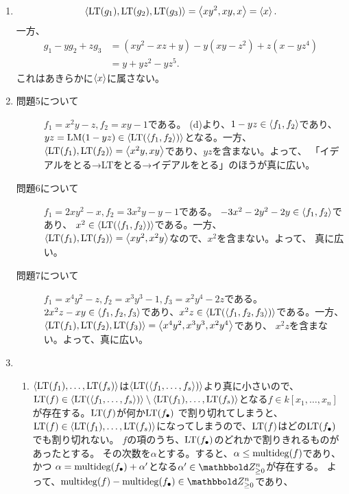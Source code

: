 \documentclass[9pt]{ltjsarticle}
\begin{document}
\begin{enumerate}[label=(問題\arabic*)]
  \item
\begin{align}
  \left\langle {\rm LT}(g_1),{\rm LT}(g_2),{\rm LT}(g_3) \right\rangle = \left\langle xy^2,xy,x \right\rangle = \left\langle x \right\rangle.
\end{align}
一方、
\begin{align}
  g_1 - yg_2 +zg_3
  &=
  (xy^2-xz+y) - y(xy-z^2) +z(x-yz^4)\\
  &=
  y+yz^2 -yz^5.
\end{align}
これはあきらかに$\left\langle x \right\rangle$に属さない。
  \item
  \begin{description}
    \item[問題5について] $f_1=x^2y-z,f_2=xy-1$である。
    (d)より、$1-yz \in \left\langle f_1,f_2 \right\rangle$であり、
    $yz = {\rm LM}(1-yz) \in \left\langle {\rm LT}(\left\langle f_1,f_2 \right\rangle) \right\rangle$となる。一方、
    $\left\langle {\rm LT}(f_1),{\rm LT}(f_2) \right\rangle = \left\langle x^2y,xy \right\rangle$であり、$yz$を含まない。よって、
    「イデアルをとる→LTをとる→イデアルをとる」のほうが真に広い。
    \item[問題6について] $f_1=2xy^2-x,f_2=3x^2y-y-1$である。
    $-3x^2-2y^2-2y \in \left\langle f_1,f_2 \right\rangle$であり、
    $x^2 \in \left\langle {\rm LT}(\left\langle f_1,f_2 \right\rangle) \right\rangle$である。一方、
    $\left\langle {\rm LT}(f_1),{\rm LT}(f_2) \right\rangle = \left\langle xy^2,x^2y \right\rangle$なので、$x^2$を含まない。よって、
    真に広い。
    \item[問題7について] $f_1=x^4y^2-z,f_2=x^3y^3-1,f_3=x^2y^4-2z$である。
    $2x^2z-xy \in \left\langle f_1,f_2,f_3 \right\rangle$であり、$x^2z \in \left\langle {\rm LT}(\left\langle f_1,f_2,f_3 \right\rangle) \right\rangle$である。一方、
    $\left\langle {\rm LT}(f_1),{\rm LT}(f_2),{\rm LT}(f_3) \right\rangle = \left\langle x^4y^2,x^3y^3,x^2y^4 \right\rangle$であり、
    $x^2z$を含まない。よって、真に広い。
  \end{description}
  \item
  \begin{enumerate}[label=(\alph*)]
    \item
  $\left\langle {\rm LT}(f_1),\dots,{\rm LT}(f_s) \right\rangle$は$\left\langle {\rm LT}(\left\langle f_1,\dots,f_s \right\rangle) \right\rangle$より真に小さいので、${\rm LT}(f)\in \left\langle {\rm LT}(\left\langle f_1,\dots,f_s \right\rangle) \right\rangle\setminus\left\langle {\rm LT}(f_1),\dots,{\rm LT}(f_s) \right\rangle$となる$f \in k[x_1,\dots,x_n]$が存在する。${\rm LT}(f)$が何か${\rm LT}(f_\bullet)$
  で割り切れてしまうと、${\rm LT}(f) \in \left\langle {\rm LT}(f_1),\dots,{\rm LT}(f_s) \right\rangle$になってしまうので、${\rm LT}(f)$はどの${\rm LT}(f_\bullet)$でも割り切れない。
  $f$の項のうち、${\rm LT}(f_\bullet)$のどれかで割りきれるものがあったとする。
  その次数を$\alpha$とする。すると、$\alpha \le \mathrm{multideg}(f)$であり、かつ
  $\alpha = \mathrm{multideg}(f_\bullet) + \alpha'$となる$\alpha' \in \Zge^n$が存在する。
よって、$\multideg(f)-\multideg(f_\bullet)\in \Zge^n$であり、
\begin{align}

\end{align}
\end{enumerate}
\end{enumerate}
\end{document}
